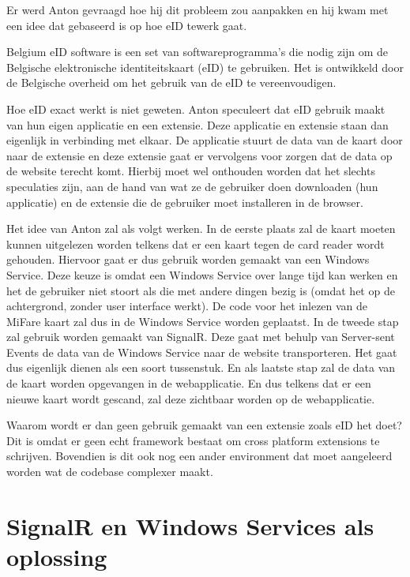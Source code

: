 Er werd Anton gevraagd hoe hij dit probleem zou aanpakken en hij kwam met een idee dat gebaseerd is op hoe eID tewerk gaat. 

Belgium eID software is een set van softwareprogramma's die nodig zijn om de Belgische elektronische identiteitskaart (eID) te gebruiken. Het is ontwikkeld door de Belgische overheid om het gebruik van de eID te vereenvoudigen. 

Hoe eID exact werkt is niet geweten. Anton speculeert dat eID gebruik maakt van hun eigen applicatie en een extensie. Deze applicatie en extensie staan dan eigenlijk in verbinding met elkaar. De applicatie stuurt de data van de kaart door naar de extensie en deze extensie gaat er vervolgens voor zorgen dat de data op de website terecht komt. Hierbij moet wel onthouden worden dat het slechts speculaties zijn, aan de hand van wat ze de gebruiker doen downloaden (hun applicatie) en de extensie die de gebruiker moet installeren in de browser. 

Het idee van Anton zal als volgt werken. In de eerste plaats zal de kaart moeten kunnen uitgelezen worden telkens dat er een kaart tegen de card reader wordt gehouden. Hiervoor gaat er dus gebruik worden gemaakt van een Windows Service. Deze keuze is omdat een Windows Service over lange tijd kan werken en het de gebruiker niet stoort als die met andere dingen bezig is (omdat het op de achtergrond, zonder user interface werkt). De code voor het inlezen van de MiFare kaart zal dus in de Windows Service worden geplaatst. In de tweede stap zal gebruik worden gemaakt van SignalR. Deze gaat met behulp van Server-sent Events de data van de Windows Service naar de website transporteren. Het gaat dus eigenlijk dienen als een soort tussenstuk. En als laatste stap zal de data van de kaart worden opgevangen in de webapplicatie. En dus telkens dat er een nieuwe kaart wordt gescand, zal deze zichtbaar worden op de webapplicatie. 

Waarom wordt er dan geen gebruik gemaakt van een extensie zoals eID het doet? Dit is omdat er geen echt framework bestaat om cross platform extensions te schrijven. Bovendien is dit ook nog een ander environment dat moet aangeleerd worden wat de codebase complexer maakt.




\section{SignalR en Windows Services als oplossing}

